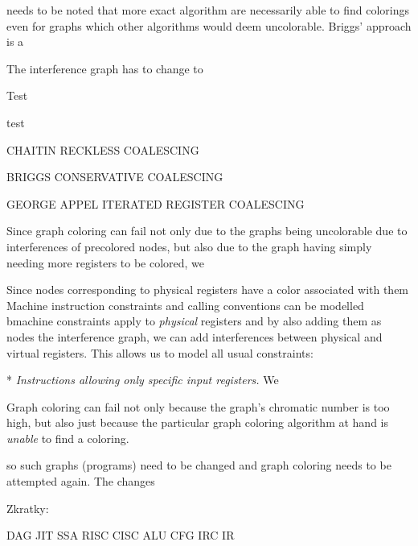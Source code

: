 needs to be noted that
more exact algorithm are necessarily able to find colorings even for graphs
which other algorithms would deem uncolorable. Briggs' approach is a 

The
interference graph has to change to 

\seccc Test

test




CHAITIN RECKLESS COALESCING

BRIGGS CONSERVATIVE COALESCING

GEORGE APPEL ITERATED REGISTER COALESCING



Since graph coloring can fail not only due to the graphs being uncolorable due
to interferences of precolored nodes, but also due to the graph having simply
needing more registers to be colored, we 

Since nodes corresponding to physical registers have a color associated with
them
Machine instruction constraints and calling conventions can be modelled bmachine constraints apply to {\em physical}
registers and by also adding them as nodes the interference graph, we can add
interferences between physical and virtual registers. This allows us to model
all usual constraints:

\begitems
* {\em Instructions allowing only specific input registers.} We 
\enditems

Graph coloring can fail not only because the graph's chromatic number is too
high, but also just because the particular graph coloring algorithm at hand is
{\em unable} to find a coloring.

so such
graphs (programs) need to be changed and graph coloring needs to be attempted
again. The changes






Zkratky:

DAG
JIT
SSA
RISC
CISC
ALU
CFG
IRC
IR
